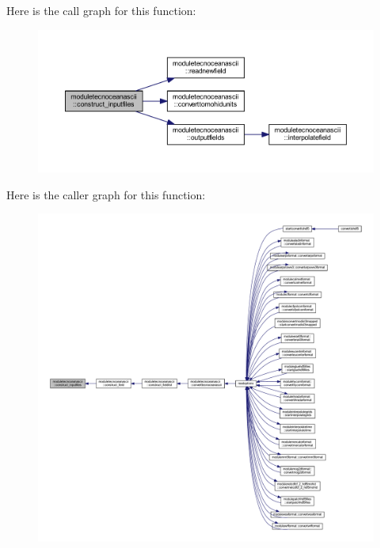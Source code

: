 Here is the call graph for this function\+:\nopagebreak
\begin{figure}[H]
\begin{center}
\leavevmode
\includegraphics[width=350pt]{namespacemoduletecnoceanascii_a974670f0506425b9522707dfc6ef649c_cgraph}
\end{center}
\end{figure}
Here is the caller graph for this function\+:\nopagebreak
\begin{figure}[H]
\begin{center}
\leavevmode
\includegraphics[width=350pt]{namespacemoduletecnoceanascii_a974670f0506425b9522707dfc6ef649c_icgraph}
\end{center}
\end{figure}
\mbox{\label{namespacemoduletecnoceanascii_a9bbaf3300cee7d2c04f566610643dbe8}} 
